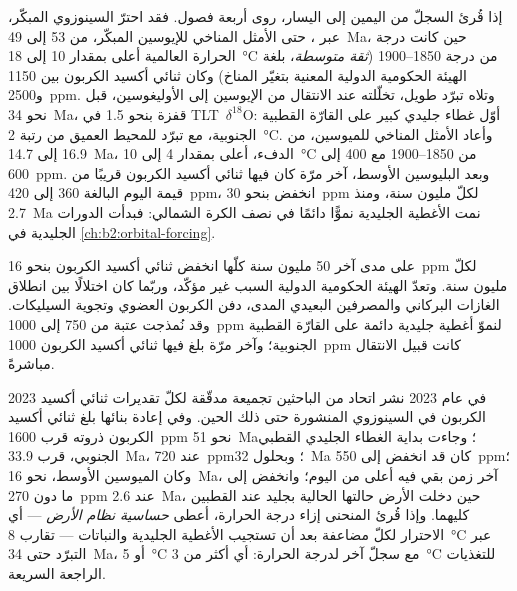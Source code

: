إذا قُرئ السجلّ من اليمين إلى اليسار، روى أربعة فصول. فقد احترّ السينوزوي المبكّر، عبر
، حتى الأمثل المناخي للإيوسين المبكّر، من 53 إلى \qty{49}{Ma}، حين
كانت درجة الحرارة العالمية أعلى بمقدار 10 إلى \qty{18}{\celsius} من درجة 1850--1900 (\emph{ثقة
متوسطة}، بلغة الهيئة الحكومية الدولية المعنية بتغيّر المناخ) وكان ثنائي أكسيد الكربون بين 1150 و\qty{2500}{ppm}.
وتلاه تبرّد طويل، تخلّلته عند الانتقال من الإيوسين إلى الأوليغوسين، قبل نحو \qty{34}{Ma}،
قفزة بنحو \qty{1.5}{\permil} في \mbox{\textdir TLT $\delta^{18}$O}: أوّل غطاء جليدي كبير على القارّة القطبية الجنوبية، مع
تبرّد للمحيط العميق من رتبة \qty{2}{\celsius}. وأعاد الأمثل المناخي للميوسين، من 16.9 إلى
\qty{14.7}{Ma}، الدفء، أعلى بمقدار 4 إلى \qty{10}{\celsius} من 1850--1900 مع 400 إلى
\qty{600}{ppm}. وبعد البليوسين الأوسط، آخر مرّة كان فيها ثنائي أكسيد الكربون قريبًا من قيمة اليوم البالغة 360 إلى
\qty{420}{ppm}، انخفض بنحو \qty{30}{ppm} لكلّ مليون سنة، ومنذ \qty{2.7}{Ma} نمت الأغطية الجليدية
نموًّا دائمًا في نصف الكرة الشمالي: فبدأت الدورات الجليدية في \cref{ch:b2:orbital-forcing}.

على مدى آخر 50 مليون سنة كلّها انخفض ثنائي أكسيد الكربون بنحو \qty{16}{ppm} لكلّ مليون
سنة. وتعدّ الهيئة الحكومية الدولية السبب غير مؤكّد، وربّما كان اختلالًا بين انطلاق الغازات البركاني
والمصرفين البعيدي المدى، دفن الكربون العضوي وتجوية السيليكات. وقد نُمذجت عتبة من 750 إلى
\qty{1000}{ppm} لنموّ أغطية جليدية دائمة على القارّة القطبية الجنوبية؛ وآخر مرّة
بلغ فيها ثنائي أكسيد الكربون \qty{1000}{ppm} كانت قبيل الانتقال مباشرةً.

\begin{dated}{2023}
في عام 2023 نشر اتحاد من الباحثين تجميعة مدقّقة لكلّ تقديرات ثنائي أكسيد الكربون في السينوزوي
المنشورة حتى ذلك الحين. وفي إعادة بنائها بلغ ثنائي أكسيد الكربون ذروته قرب \qty{1600}{ppm} نحو
\qty{51}{Ma}؛ وجاءت بداية الغطاء الجليدي القطبي الجنوبي، قرب \qty{33.9}{Ma}، عند \qty{720}{ppm}؛
وبحلول \qty{32}{Ma} كان قد انخفض إلى \qty{550}{ppm}؛ وكان الميوسين الأوسط، نحو \qty{16}{Ma}، آخر
زمن بقي فيه أعلى من اليوم؛ وانخفض إلى ما دون \qty{270}{ppm} عند \qty{2.6}{Ma}، حين دخلت الأرض
حالتها الحالية بجليد عند القطبين كليهما. وإذا قُرئ المنحنى إزاء درجة الحرارة، أعطى
\emph{حساسية نظام الأرض} --- أي الاحترار لكلّ مضاعفة بعد أن تستجيب الأغطية الجليدية والنباتات ---
تقارب \qty{8}{\celsius} عبر التبرّد حتى \qty{34}{Ma}، أو \qty{5}{\celsius}
مع سجلّ آخر لدرجة الحرارة: أي أكثر من \qty{3}{\celsius} للتغذيات الراجعة السريعة.
\end{dated}

